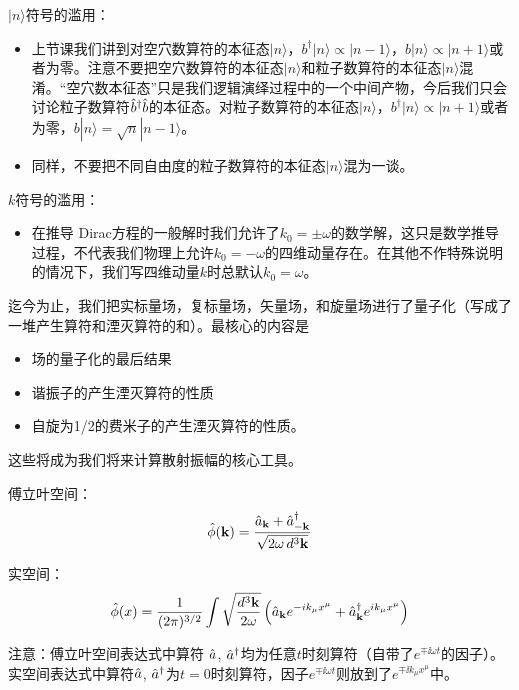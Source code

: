 \documentclass[CJK]{beamer}
\begin{document}
\begin{frame}
\bch
$|n\rangle$符号的滥用：
\begin{itemize}
\item{上节课我们讲到对空穴数算符的本征态$|n\rangle$，$b^\dagger|n\rangle \propto |n-1\rangle$，$b|n\rangle \propto |n+1\rangle$或者为零。注意不要把空穴数算符的本征态$|n\rangle$和粒子数算符的本征态$|n\rangle$混淆。“空穴数本征态”只是我们逻辑演绎过程中的一个中间产物，今后我们只会讨论粒子数算符${\hat{b}^\dagger}{\hat{b}}$的本征态。对粒子数算符的本征态$|n\rangle$，$b^\dagger |n\rangle \propto |n+1\rangle$或者为零，$b|n\rangle =\sqrt{n} |n-1\rangle$。}
\item{同样，不要把不同自由度的粒子数算符的本征态$|n\rangle$混为一谈。}
\end{itemize}
\ech
\end{frame}

\begin{frame}
\bch
$k$符号的滥用：

\begin{itemize}
\item{在推导 Dirac方程的一般解时我们允许了$k_0 = \pm \omega$的数学解，这只是数学推导过程，不代表我们物理上允许$k_0 = -\omega$的四维动量存在。在其他不作特殊说明的情况下，我们写四维动量$k$时总默认$k_0=\omega$。}
\end{itemize}

\ech
\end{frame}

\begin{frame}
\bch
迄今为止，我们把实标量场，复标量场，矢量场，和旋量场进行了量子化（写成了一堆产生算符和湮灭算符的和）。最核心的内容是
\begin{itemize}
\item{场的量子化的最后结果}
\item{谐振子的产生湮灭算符的性质}
\item{自旋为1/2的费米子的产生湮灭算符的性质。}
\end{itemize}
这些将成为我们将来计算散射振幅的核心工具。
\ech
\end{frame}

\begin{frame}
\bch

傅立叶空间：
$${\hat{\phi}}({\mathbf{k}}) = \frac{{\hat{a}}_{{\mathbf{k}}}+{\hat{a}^\dagger}_{-{\mathbf{k}}}}{\sqrt{2\omega\, d^3{\mathbf{k}}}}$$


\skipline
实空间：
$${\hat{\phi}}(x) = \frac{1}{(2\pi)^{3/2}} \int \sqrt{\frac{d^3{\mathbf{k}}}{2\omega}} \left({\hat{a}}_{{\mathbf{k}}} e^{-ik_\mu x^\mu} + {\hat{a}^\dagger}_{{\mathbf{k}}}e^{ik_\mu x^\mu}\right) $$

\skipline
{\small
注意：傅立叶空间表达式中算符 ${\hat{a}}$, ${\hat{a}^\dagger}$均为任意$t$时刻算符（自带了$e^{\mp\ii\omega t}$的因子）。实空间表达式中算符${\hat{a}}$, ${\hat{a}^\dagger}$为$t=0$时刻算符，因子$e^{\mp\ii\omega t}$则放到了$e^{\mp \ii k_\mu x^\mu}$中。
}
\ech
\end{frame}
\end{document}
